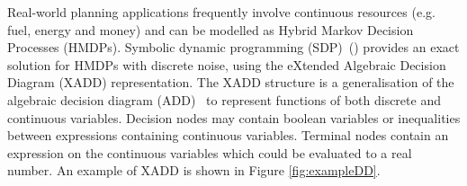 Real-world planning applications frequently involve continuous resources (e.g. fuel, energy and money) and can be modelled as Hybrid Markov Decision Processes (HMDPs). 
Symbolic dynamic programming (SDP)~(\cite{sanner11,zamani12}) provides an exact solution for HMDPs with discrete noise, using the eXtended Algebraic Decision Diagram (XADD) representation.
The XADD structure is a generalisation of the algebraic decision diagram (ADD)~\cite{bahar93add} to represent functions of both discrete and continuous variables.
Decision nodes may contain boolean variables or inequalities between expressions containing continuous variables.
Terminal nodes contain an expression on the continuous variables which could be evaluated to a real number. An example of XADD is shown in Figure \ref{fig:exampleDD}.

